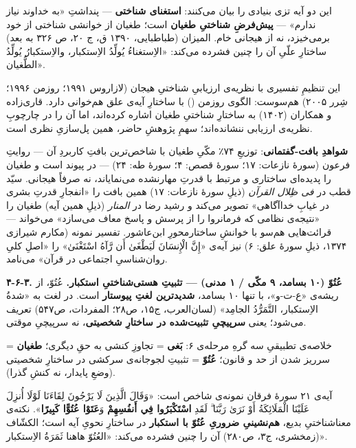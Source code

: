 \documentclass[12pt,a4paper]{article}
\begin{document}
\begin{RTL}
\begin{otherlanguage}{persian}
این دو آیه تزی بنیادی را بیان می‌کنند: \textbf{استغنای شناختی} --- پنداشتِ
«به خداوند نیاز ندارم» --- \textbf{پیش‌فرضِ شناختیِ طغیان} است؛ طغیان از
خوانشی شناختی از خود برمی‌خیزد، نه از هیجانی خام. المیزان (طباطبایی، ۱۳۹۰
ق، ج ۲۰، ص ۳۲۶ به بعد) ساختارِ علّیِ آن را چنین فشرده می‌کند: «الاِستغناءُ
یُولِّدُ الاِستکبار، والاِستکبارُ یُولِّدُ الطُّغیان».

این تنظیمِ تفسیری با نظریه‌ی ارزیابیِ شناختیِ هیجان (لازاروس ۱۹۹۱؛ روزمن
۱۹۹۶؛ شِرر ۲۰۰۵) هم‌سوست: الگوی روزمن
() با ساختارِ آیه‌ی
علق هم‌خوانی دارد. قاری‌زاده و همکاران (۱۴۰۲) به ساختارِ شناختیِ طغیان اشاره
کرده‌اند، اما آن را در چارچوبِ نظریه‌ی ارزیابی ننشانده‌اند؛ سهمِ پژوهشِ حاضر،
همین پل‌سازیِ نظری است.

\textbf{شواهدِ بافت-گفتمانی}: توزیعِ ۷۴٪ مکّیِ طغیان با شاخص‌ترین بافتِ کاربردِ
آن --- روایتِ فرعون (سورۀ نازعات: ۱۷؛ سورۀ قصص: ۴؛ سورۀ طه: ۲۴) --- در
پیوند است و طغیان را پدیده‌ای ساختاری و مرتبط با قدرتِ مهارنشده می‌نمایاند،
نه صرفاً هیجانی. سیّد قطب در \emph{فی ظِلال القرآن} (ذیلِ سورۀ نازعات: ۱۷)
همین بافت را «انفجارِ قدرتِ بشری در غیابِ خداآگاهی» تصویر می‌کند و رشید رضا
در \emph{المنار} (ذیلِ همین آیه) طغیان را «نتیجه‌ی نظامی که فرمانروا را از
پرسش و پاسخ معاف می‌سازد» می‌خواند --- قرائت‌هایی هم‌سو با خوانشِ ساختارمحورِ
ابن‌عاشور. تفسیر نمونه (مکارم شیرازی ۱۳۷۴، ذیلِ سورۀ علق: ۶) نیز آیه‌ی «إِنَّ
الْإِنسَانَ لَيَطْغَىٰ أَن رَّآهُ اسْتَغْنَىٰ» را «اصلِ کلیِ روان‌شناسیِ اجتماعی در قرآن»
می‌نامد.

\textbf{۴-۶-۳. عُتُوّ (۱۰ بسامد، ۹ مکّی / ۱ مدنی) --- تثبیتِ هستی‌شناختیِ
استکبار.} عُتُوّ، از ریشه‌ی «ع-ت-و»، با تنها ۱۰ بسامد، \textbf{شدیدترین لغتِ
پیوستار} است. در لغت به «شدةُ الاِستکبار، التَّمَرُّدُ الجامِد» (لسان‌العرب، ج۱۵،
ص۲۸؛ المفردات، ص۵۴۷) تعریف می‌شود؛ یعنی \textbf{سرپیچیِ تثبیت‌شده در ساختارِ
شخصیتی}، نه سرپیچیِ موقتی.

خلاصه‌ی تطبیقیِ سه گرهِ مرحله‌ی ۶: \textbf{بَغی} = تجاوزِ کنشی به حقِ دیگری؛
\textbf{طغیان} = سرریز شدن از حد و قانون؛ \textbf{عُتُوّ} = تثبیتِ لجوجانه‌ی
سرکشی در ساختارِ شخصیتی (وضعِ پایدار، نه کنشِ گذرا).

آیه‌ی ۲۱ سورۀ فرقان نمونه‌ی شاخص است: «وَقَالَ الَّذِينَ لَا يَرْجُونَ لِقَاءَنَا لَوْلَا
أُنزِلَ عَلَيْنَا الْمَلَائِكَةُ أَوْ نَرَىٰ رَبَّنَا ۗ لَقَدِ \textbf{اسْتَكْبَرُوا فِي أَنفُسِهِمْ}
وَ\textbf{عَتَوْا عُتُوًّا كَبِيرًا}». نکته‌ی معناشناختیِ بدیع، \textbf{هم‌نشینیِ ضروریِ
عُتُوّ با استکبار} در ساختارِ نحویِ آیه است؛ الکشّاف (زمخشری، ج۳، ص۲۸۰) آن را
چنین فشرده می‌کند: «العُتُوّ هاهنا ثَمَرَةُ الاِستکبار».


\end{otherlanguage}
\end{RTL}
\end{document}
